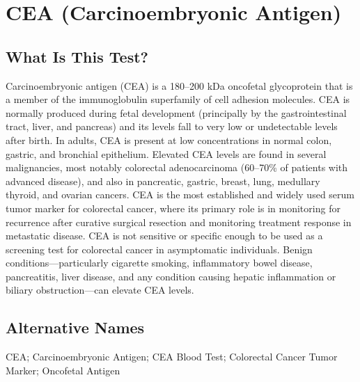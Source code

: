 \chapter{CEA (Carcinoembryonic Antigen)}

\section*{What Is This Test?}
Carcinoembryonic antigen (CEA) is a 180--200 kDa oncofetal glycoprotein that is a member of the immunoglobulin superfamily of cell adhesion molecules. CEA is normally produced during fetal development (principally by the gastrointestinal tract, liver, and pancreas) and its levels fall to very low or undetectable levels after birth. In adults, CEA is present at low concentrations in normal colon, gastric, and bronchial epithelium. Elevated CEA levels are found in several malignancies, most notably colorectal adenocarcinoma (60--70\% of patients with advanced disease), and also in pancreatic, gastric, breast, lung, medullary thyroid, and ovarian cancers. CEA is the most established and widely used serum tumor marker for colorectal cancer, where its primary role is in monitoring for recurrence after curative surgical resection and monitoring treatment response in metastatic disease. CEA is not sensitive or specific enough to be used as a screening test for colorectal cancer in asymptomatic individuals. Benign conditions---particularly cigarette smoking, inflammatory bowel disease, pancreatitis, liver disease, and any condition causing hepatic inflammation or biliary obstruction---can elevate CEA levels.

\section*{Alternative Names}
CEA; Carcinoembryonic Antigen; CEA Blood Test; Colorectal Cancer Tumor Marker; Oncofetal Antigen

